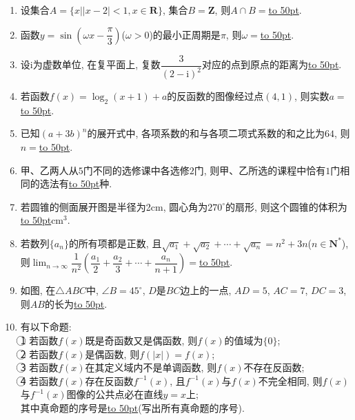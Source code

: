 \documentclass[10pt,a4paper]{article}
\newcommand{\blank}[1]{\underline{\hbox to #1pt{}}}
\begin{document}
\begin{enumerate}[1.]

\item 设集合$A=\{x||x-2|<1,x\in \mathbf{R}\}$, 集合$B=\mathbf{Z}$, 则$A\cap B=$\blank{50}.
\item 函数$y=\sin (\omega x-\dfrac{\pi}{3})$($\omega >0$)的最小正周期是$\pi$, 则$\omega =$\blank{50}.
\item 设$\mathrm{i}$为虚数单位, 在复平面上, 复数$\dfrac{3}{(2-\mathrm{i})^2}$对应的点到原点的距离为\blank{50}.
\item 若函数$f(x)=\log_2 (x+1)+a$的反函数的图像经过点$(4,1)$, 则实数$a=$\blank{50}.
\item 已知$(a+3b)^n$的展开式中, 各项系数的和与各项二项式系数的和之比为$64$, 则$n=$\blank{50}.
\item 甲、乙两人从$5$门不同的选修课中各选修$2$门, 则甲、乙所选的课程中恰有$1$门相同的选法有\blank{50}种.
\item 若圆锥的侧面展开图是半径为2$\text{cm}$, 圆心角为$270^\circ$的扇形, 则这个圆锥的体积为\blank{50}$\text{cm}^3$.
\item 若数列$\{a_n\}$的所有项都是正数, 且$\sqrt{a_1}+\sqrt{a_2}+\cdots +\sqrt{a_n}=n^2+3n$($n\in \mathbf{N}^*$), 则$\displaystyle\lim_{n\to\infty}\dfrac{1}{n^2}(\dfrac{a_1}{2}+\dfrac{a_2}{3}+\cdots +\dfrac{a_n}{n+1})=$\blank{50}.
\item 如图, 在$\triangle ABC$中, $\angle B=45^\circ$, $D$是$BC$边上的一点, $AD=5$, $AC=7$, $DC=3$, 则$AB$的长为\blank{50}.
\begin{center}
\end{center}
\item 有以下命题:\\
\textcircled{1} 若函数$f(x)$既是奇函数又是偶函数, 则$f(x)$的值域为$\{0\}$; \\
\textcircled{2} 若函数$f(x)$是偶函数, 则$f(|x|)=f(x)$;\\
\textcircled{3} 若函数$f(x)$在其定义域内不是单调函数, 则$f(x)$不存在反函数;\\
\textcircled{4} 若函数$f(x)$存在反函数${{f}^{-1}}(x)$, 且${{f}^{-1}}(x)$与$f(x)$不完全相同, 则$f(x)$与${{f}^{-1}}(x)$图像的公共点必在直线$y=x$上; \\
其中真命题的序号是\blank{50}(写出所有真命题的序号).


\end{enumerate}
\end{document}
